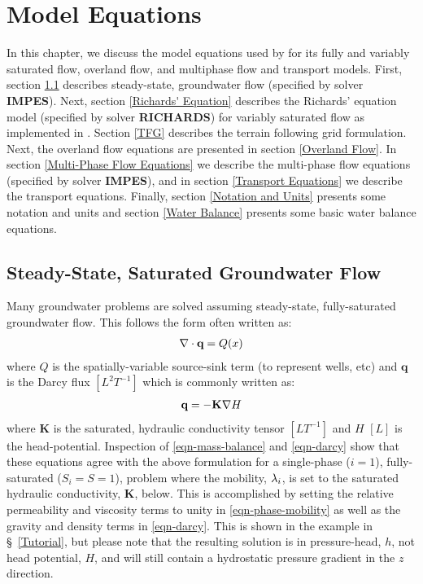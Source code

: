 
\chapter{Model Equations}
\label{Model_Equations}

In this chapter, we discuss the model equations used by \parflow{} for its
fully and variably saturated flow, overland flow, and multiphase flow and transport models.
First, section \ref{Steady-State, Saturated Groundwater Flow} describes steady-state, groundwater flow (specified by solver {\bf IMPES}). Next, section \ref{Richards' Equation}
describes the Richards' equation model (specified by solver {\bf RICHARDS}) for variably saturated flow as
implemented in \parflow{}. Section \ref{TFG} describes the terrain following grid formulation. Next, the overland flow
equations are presented in section \ref{Overland Flow}.
In section \ref{Multi-Phase Flow Equations} we describe the multi-phase
flow equations (specified by solver {\bf IMPES}), and in section \ref{Transport Equations} we describe
the transport equations. Finally, section \ref{Notation and Units} presents some notation and units and section \ref{Water Balance}
presents some basic water balance equations.
\section{Steady-State, Saturated Groundwater Flow}
\label{Steady-State, Saturated Groundwater Flow}
Many groundwater problems are solved assuming steady-state, fully-saturated groundwater flow.  This follows the form often written as:
\begin{eqnarray}
\nabla \cdot \textbf{q} = Q(x)
\label{eq:ssgw}
\end{eqnarray}
where $Q$ is the spatially-variable source-sink term (to represent wells, etc) and $\textbf{q}$ is the Darcy flux $[L^{2}T^{-1}]$ which is commonly written as:
\begin{eqnarray}
\textbf{q}=- \textbf{K} \nabla H
\label{eq:Darcy}
\end{eqnarray}
where $\textbf{K}$ is the saturated, hydraulic conductivity tensor $[LT^{-1}]$ and $H$ $[L]$ is the head-potential.  Inspection of \ref{eqn-mass-balance} and \ref{eqn-darcy} show that these equations agree with the above formulation for a single-phase ($i=1$), fully-saturated ($S_i=S=1$), problem where the mobility, ${\lambda}_i$, is set to the saturated hydraulic conductivity, $\textbf{K}$, below.  This is accomplished by setting the relative permeability and viscosity terms to unity in \ref{eqn-phase-mobility} as well as the gravity and density terms in \ref{eqn-darcy}.  This is shown in the example in \S~\ref{Tutorial}, but please note that the resulting solution is in pressure-head, $h$, not head potential, $H$, and will still contain a hydrostatic pressure gradient in the $z$ direction.

